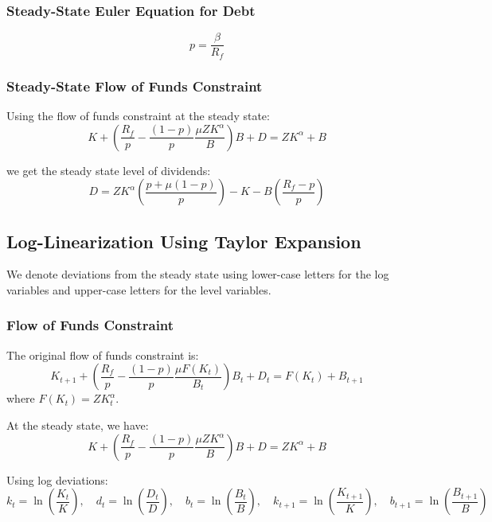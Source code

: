 \subsubsection{Steady-State Euler Equation for Debt}
\begin{equation}
p = \frac{\beta}{R_f}
\end{equation}


\subsubsection{Steady-State Flow of Funds Constraint}
Using the flow of funds constraint at the steady state:
\begin{equation}
K + \left( \frac{R_f}{p} - \frac{(1-p)}{p} \frac{\mu Z K^\alpha}{B} \right) B + D = Z K^\alpha + B
\end{equation}

we get the steady state level of dividends:
\begin{equation}
D = Z K^\alpha \left(\frac{p + \mu (1-p)}{p}\right) - K - B \left(\frac{R_f - p}{p}\right)
\end{equation}

\subsection{Log-Linearization Using Taylor Expansion}

We denote deviations from the steady state using lower-case letters for the log variables and upper-case letters for the level variables.

\subsubsection{Flow of Funds Constraint}

The original flow of funds constraint is:
\begin{equation}
K_{t+1} + \left( \frac{R_f}{p} - \frac{(1-p)}{p} \frac{\mu F(K_t)}{B_t} \right) B_t + D_t = F(K_t) + B_{t+1}
\end{equation}
where $F(K_t) = Z K_t^\alpha$.

At the steady state, we have:
\begin{equation}
K + \left( \frac{R_f}{p} - \frac{(1-p)}{p} \frac{\mu Z K^\alpha}{B} \right) B + D = Z K^\alpha + B
\end{equation}

Using log deviations:
\begin{equation}
k_t = \ln\left(\frac{K_t}{K}\right), \quad d_t = \ln\left(\frac{D_t}{D}\right), \quad b_t = \ln\left(\frac{B_t}{B}\right), \quad k_{t+1} = \ln\left(\frac{K_{t+1}}{K}\right), \quad b_{t+1} = \ln\left(\frac{B_{t+1}}{B}\right)
\end{equation}

